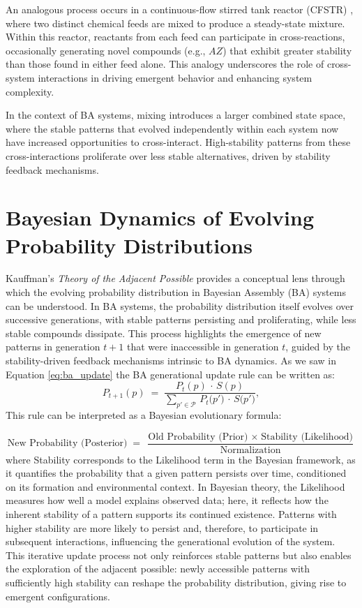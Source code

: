 \documentclass[entropy,article,submit,pdftex,moreauthors]{Definitions/mdpi}
\begin{document}
An analogous process occurs in a continuous-flow stirred tank reactor (CFSTR) \cite{fogler1999chemical}, where two distinct chemical feeds are mixed to produce a steady-state mixture. Within this reactor, reactants from each feed can participate in cross-reactions, occasionally generating novel compounds (e.g., \( AZ \)) that exhibit greater stability than those found in either feed alone. This analogy underscores the role of cross-system interactions in driving emergent behavior and enhancing system complexity.

In the context of BA systems, mixing introduces a larger combined state space, where the stable patterns that evolved independently within each system now have increased opportunities to cross-interact. High-stability patterns from these cross-interactions proliferate over less stable alternatives, driven by stability feedback mechanisms.

\section{Bayesian Dynamics of Evolving Probability Distributions}

Kauffman's \emph{Theory of the Adjacent Possible} \cite{kauffman2000investigations} \cite{kauffman2024tap} provides a conceptual lens through which the evolving probability distribution in Bayesian Assembly (BA) systems can be understood. In BA systems, the probability distribution itself evolves over successive generations, with stable patterns persisting and proliferating, while less stable compounds dissipate. This process highlights the emergence of new patterns in generation \( t+1 \) that were inaccessible in generation \( t \), guided by the stability-driven feedback mechanisms intrinsic to BA dynamics. As we saw in Equation \ref{eq:ba_update} the BA generational update rule can be written as:
\begin{equation}
P_{t+1}(p) \;=\; 
\frac{\,P_t(p)\,\cdot\,S(p)\,}
     {\sum_{p' \in \mathcal{P}}\,P_t\!\bigl(p'\bigr)\,\cdot\,S\!\bigl(p'\bigr)},
\end{equation} 
This rule can be interpreted as a Bayesian evolutionary formula:

\begin{equation}
\text{New Probability (Posterior)}
\;=\;
\frac{\text{Old Probability (Prior)} \;\times\; \text{Stability (Likelihood)}}
     {\text{Normalization}}
\end{equation}
where Stability corresponds to the Likelihood term in the Bayesian framework, as it quantifies the probability that a given pattern persists over time, conditioned on its formation and environmental context. In Bayesian theory, the Likelihood measures how well a model explains observed data; here, it reflects how the inherent stability of a pattern supports its continued existence. Patterns with higher stability are more likely to persist and, therefore, to participate in subsequent interactions, influencing the generational evolution of the system. This iterative update process not only reinforces stable patterns but also enables the exploration of the adjacent possible: newly accessible patterns with sufficiently high stability can reshape the probability distribution, giving rise to emergent configurations.
\end{document}
